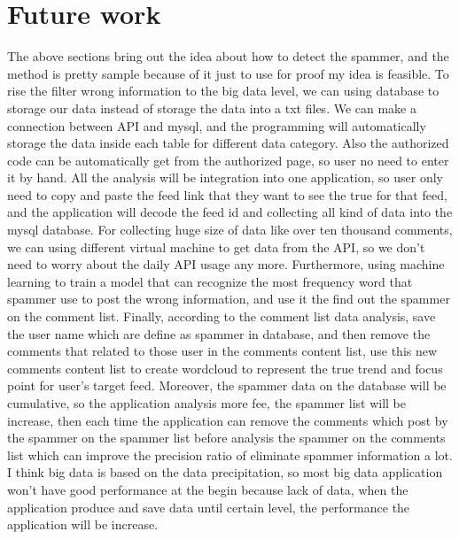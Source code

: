 \documentclass[sigconf]{acmart}
\begin{document}
\section{Future work}
The above sections bring out the idea about how to detect the spammer, and the method is pretty sample because of it just to use for proof my idea is feasible. To rise the filter wrong information to the big data level, we can using database to storage our data instead of storage the data into a txt files. We can make a connection between API and mysql, and the programming will automatically storage the data inside each table for different data category. Also the authorized code can be automatically get from the authorized page, so user no need to enter it by hand. All the analysis will be integration into one application, so user only need to copy and paste the feed link that they want to see the true for that feed, and the application will decode the feed id and collecting all kind of data into the mysql database. For collecting huge size of data like over ten thousand comments, we can using different virtual machine to get data from the API, so we don't need to worry about the daily API usage any more.
Furthermore, using machine learning to train a model that can recognize the most frequency word that spammer use to post the wrong information, and use it the find out the spammer on the comment list. Finally, according to the comment list data analysis, save the user name which are define as spammer in database, and then remove the comments that related to those user in the comments content list, use this new comments content list to create wordcloud to represent the true trend and focus point for user's target feed. Moreover, the spammer data on the database will be cumulative, so the application analysis 
more fee, the spammer list will be increase, then each time the application can remove the comments which post by the spammer on the spammer list before analysis the spammer on the comments list which can improve the precision ratio of eliminate spammer information a lot. I think big data is based on the data precipitation, so most big data application won't have good performance at the begin because lack of data, when the application produce and save data until certain level, the performance the application  will be increase.
\end{document}
